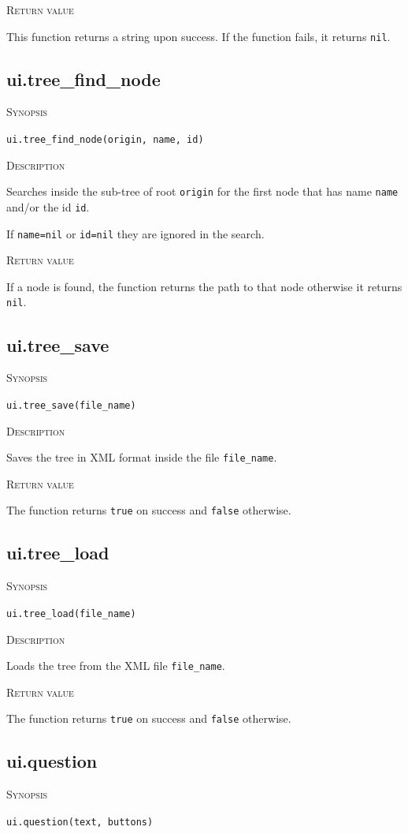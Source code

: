 \documentclass[11pt]{report}
\newcommand{\mansection}[1]{\vspace{0.5em}\par\noindent\textsc{#1}\vspace{0.5em}\par}
\newcommand{\syn}[1]{\texttt{#1}}
\begin{document}
\mansection{Return value}
  This function returns a string upon success.
  If the function fails, it returns \syn{nil}.


\subsection{ui.tree\_find\_node}

\mansection{Synopsis}
\syn{ui.tree\_find\_node(origin, name, id)}

\mansection{Description}
  Searches inside the sub-tree of root \syn{origin} for the first node that has 
  name \syn{name} and/or the id \syn{id}.

  If \syn{name=nil} or \syn{id=nil} they are ignored in the search.

\mansection{Return value}
  If a node is found, the function returns the path to that node otherwise 
  it returns \syn{nil}.


\subsection{ui.tree\_save}

\mansection{Synopsis}
\syn{ui.tree\_save(file\_name)}

\mansection{Description}
  Saves the tree in XML format inside the file \syn{file\_name}.

\mansection{Return value}
  The function returns \syn{true} on success and \syn{false} otherwise.


\subsection{ui.tree\_load}

\mansection{Synopsis}
\syn{ui.tree\_load(file\_name)}

\mansection{Description}
  Loads the tree from the XML file \syn{file\_name}.

\mansection{Return value}
  The function returns \syn{true} on success and \syn{false} otherwise.


\subsection{ui.question}

\mansection{Synopsis}
\syn{ui.question(text, buttons)}
\end{document}
